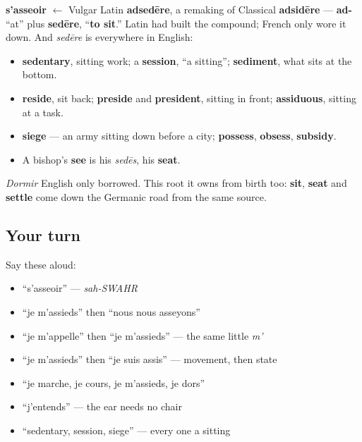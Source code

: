 \begin{cousinweb}
\textbf{s'asseoir} $\leftarrow$ Vulgar Latin \textbf{adsedēre}, a remaking of Classical \textbf{adsidēre} — \textbf{ad-} \textquotedblleft{}at\textquotedblright{} plus \textbf{sedēre}, \textquotedblleft{}\textbf{to sit}.\textquotedblright{} Latin had built the compound; French only wore it down. And \emph{sedēre} is everywhere in English:

\begin{itemize}
\raggedright
  \item \textbf{sedentary}, sitting work; a \textbf{session}, \textquotedblleft{}a sitting\textquotedblright{}; \textbf{sediment}, what sits at the bottom.
  \item \textbf{reside}, sit back; \textbf{preside} and \textbf{president}, sitting in front; \textbf{assiduous}, sitting at a task.
  \item \textbf{siege} — an army sitting down before a city; \textbf{possess}, \textbf{obsess}, \textbf{subsidy}.
  \item A bishop's \textbf{see} is his \emph{sedēs}, his \textbf{seat}.
\end{itemize}

\emph{Dormir} English only borrowed. This root it owns from birth too: \textbf{sit}, \textbf{seat} and \textbf{settle} come down the Germanic road from the same source.
\end{cousinweb}

\subsection*{Your turn}
Say these aloud:

\begin{itemize}
\raggedright
  \item \textquotedblleft{}s'asseoir\textquotedblright{} — \emph{sah-SWAHR}
  \item \textquotedblleft{}je m'assieds\textquotedblright{} then \textquotedblleft{}nous nous asseyons\textquotedblright{}
  \item \textquotedblleft{}je m'appelle\textquotedblright{} then \textquotedblleft{}je m'assieds\textquotedblright{} — the same little \emph{m'}
  \item \textquotedblleft{}je m'assieds\textquotedblright{} then \textquotedblleft{}je suis assis\textquotedblright{} — movement, then state
  \item \textquotedblleft{}je marche, je cours, je m'assieds, je dors\textquotedblright{}
  \item \textquotedblleft{}j'entends\textquotedblright{} — the ear needs no chair
  \item \textquotedblleft{}sedentary, session, siege\textquotedblright{} — every one a sitting
\end{itemize}

